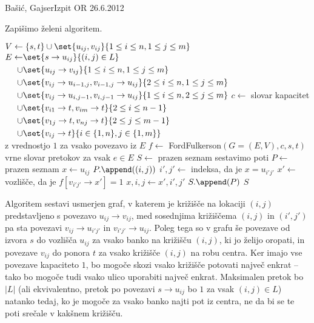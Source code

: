 \begin{naloga}{Bašić, Gajser}{Izpit OR 26.6.2012}
\begin{odgovor}
Zapišimo želeni algoritem.
\begin{small}
\begin{algorithmic}
        \State {}
    \EndIf
    \State $V \gets \{s, t\}
              \cup \set{u_{ij}, v_{ij}}{1 \le i \le n, 1 \le j \le m}$
    \State $\begin{aligned}
        E \gets&{} \set{s \to u_{ij}}{(i, j) \in L} \\
           \cup&{} \set{u_{ij} \to v_{ij}}{1 \le i \le n, 1 \le j \le m} \\
           \cup&{} \set{v_{ij} \to u_{i-1, j}, v_{i-1, j} \to u_{ij}}{2 \le i \le n, 1 \le j \le m} \\
           \cup&{} \set{v_{ij} \to u_{i, j-1}, v_{i, j-1} \to u_{ij}}{1 \le i \le n, 2 \le j \le m} \\
           \cup&{} \set{v_{i1} \to t, v_{im} \to t}{2 \le i \le n-1} \\
           \cup&{} \set{v_{1j} \to t, v_{nj} \to t}{2 \le j \le m-1} \\
           \cup&{} \set{v_{ij} \to t}{i \in \{1, n\}, j \in \{1, m\}}
        \end{aligned}$
    \State $c \gets$ slovar kapacitet z vrednostjo $1$ za vsako povezavo iz $E$
    \State $f \gets$ {\sc FordFulkerson}$(G = (E, V), c, s, t)$
        \hfill vrne slovar pretokov za vsak $e \in E$
        \State {}
    \EndIf
    \State $S \gets$ prazen seznam
     \hfill sestavimo poti
        \State $P \gets$ prazen seznam
        \State $x \gets u_{ij}$
            \State $P.\append((i, j))$
            \State $i', j' \gets$ indeksa, da je $x = u_{i'j'}$
            \State $x' \gets$ vozlišče, da je $f[v_{i'j'} \to x'] = 1$
            \State $x, i, j \gets x', i', j'$
        \EndWhile
        \State $S.\append(P)$
    \EndFor
    \State \Return $S$
\EndFunction
\end{algorithmic}
\end{small}
Algoritem sestavi usmerjen graf,
v katerem je križišče na lokaciji $(i, j)$
pred\-stav\-lje\-no s povezavo $u_{ij} \to v_{ij}$,
med sosednjima križiščema $(i, j)$ in $(i', j')$
pa sta povezavi $v_{ij} \to u_{i'j'}$ in $v_{i'j'} \to u_{ij}$.
Poleg tega so v grafu še povezave od izvora $s$ do vozlišča $u_{ij}$
za vsako banko na križišču $(i, j)$,
ki jo želijo oropati,
in povezave $v_{ij}$ do ponora $t$ za vsako križišče $(i, j)$ na robu centra.
Ker imajo vse povezave kapaciteto $1$,
bo mogoče skozi vsako križišče potovati največ enkrat
-- tako bo mogoče tudi vsako ulico uporabiti največ enkrat.
Maksimalen pretok bo $|L|$
(ali ekvivalentno,
pretok po povezavi $s \to u_{ij}$ bo $1$ za vsak $(i, j) \in L$)
natanko tedaj,
ko je mogoče za vsako banko najti pot iz centra,
ne da bi se te poti srečale v kakšnem križišču.
\end{odgovor}
\end{naloga}

